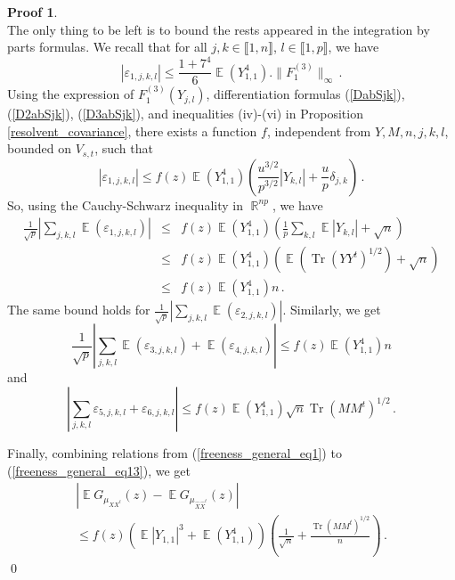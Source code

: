 \documentclass[11pt,a4paper]{article}
\DeclareMathOperator{\E}{\mathbb{E}}
\DeclareMathOperator{\R}{\mathbb{R}}
\DeclareMathOperator{\1}{\mathbf{1}}
\DeclareMathOperator{\Tr}{\mathrm{Tr}}
\newcommand{\Xhat}{\widehat{X}}
\theoremstyle{definition}
\newtheorem*{Proof}{Proof}
\begin{document}
\begin{Proof}
\noindent {}\\
The only thing to be left is to bound the rests appeared in the integration by parts formulas.
We recall that for all $j,k \in \llbracket1,n \rrbracket$, $l \in \llbracket 1,p \rrbracket$, we have
\begin{displaymath}
|\varepsilon_{1,j,k,l}| \le \frac{1+7^4}{6} \E(Y_{1,1}^4) . \|F_1^{(3)}\|_{\infty} \, .
\end{displaymath}
Using the expression of $F_1^{(3)}(Y_{j,l})$, differentiation formulas (\ref{DabSjk}), (\ref{D2abSjk}), (\ref{D3abSjk}), and inequalities (iv)-(vi) in Proposition \ref{resolvent_covariance}, there exists a function $f$, independent from $Y,M,n,j,k,l$, bounded on $V_{s,t}$, such that
\begin{displaymath}
|\varepsilon_{1,j,k,l}| \le f(z) \E(Y_{1,1}^4) \left( \frac{u^{3/2}}{p^{3/2}} |Y_{k,l}| + \frac{u}{p} \delta_{j,k} \right) \, .
\end{displaymath}
So, using the Cauchy-Schwarz inequality in $\R^{np}$, we have
\begin{eqnarray} \label{freeness_general_eq11}
\frac{1}{\sqrt{p}} \left| \sum_{j,k,l} \E(\varepsilon_{1,j,k,l}) \right|
& \le & f(z) \E(Y_{1,1}^4) \left( \frac1p \sum_{k,l} \E |Y_{k,l}| + \sqrt{n} \right) \nonumber \\
& \le & f(z) \E(Y_{1,1}^4) \left( \E (\Tr(YY^t)^{1/2}) + \sqrt{n} \right) \nonumber \\
& \le & f(z) \E(Y_{1,1}^4) n \, .
\end{eqnarray}
The same bound holds for $\frac{1}{\sqrt{p}} \left| \sum_{j,k,l} \E(\varepsilon_{2,j,k,l}) \right|$. Similarly, we get
\begin{equation} \label{freeness_general_eq12}
\frac{1}{\sqrt{p}} \left| \sum_{j,k,l} \E(\varepsilon_{3,j,k,l}) + \E(\varepsilon_{4,j,k,l}) \right| \le f(z) \E(Y_{1,1}^4) n
\end{equation}
and
\begin{equation} \label{freeness_general_eq13}
\left| \sum_{j,k,l} \varepsilon_{5,j,k,l} + \varepsilon_{6,j,k,l} \right| \le f(z) \E(Y_{1,1}^4) \sqrt{n} \Tr(MM^t)^{1/2} \, .
\end{equation}

Finally, combining relations from (\ref{freeness_general_eq1}) to (\ref{freeness_general_eq13}), we get
\begin{multline}
\left| \E G_{\mu_{XX^t}}(z) - \E G_{\mu_{\Xhat\Xhat^t}}(z) \right| \\
\le f(z) \left( \E|Y_{1,1}|^3 + \E(Y_{1,1}^4) \right) \left( \frac{1}{\sqrt{n}} + \frac{\Tr(MM^t)^{1/2}}{n} \right) \, .
\end{multline} \qed
\end{Proof}
\end{document}
